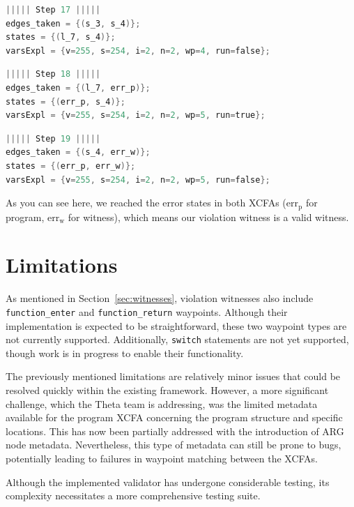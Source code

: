 \begin{lstlisting}[style=C, language=C, basicstyle=\ttfamily\footnotesize, columns=flexible,
    breaklines=true, breakatwhitespace=true, tabsize=2, showstringspaces=false]
||||| Step 17 |||||
edges_taken = {(s_3, s_4)};
states = {(l_7, s_4)};
varsExpl = {v=255, s=254, i=2, n=2, wp=4, run=false};
\end{lstlisting}
\begin{lstlisting}[style=C, language=C, basicstyle=\ttfamily\footnotesize, columns=flexible,
    breaklines=true, breakatwhitespace=true, tabsize=2, showstringspaces=false]
||||| Step 18 |||||
edges_taken = {(l_7, err_p)};
states = {(err_p, s_4)};
varsExpl = {v=255, s=254, i=2, n=2, wp=5, run=true};
\end{lstlisting}
\begin{lstlisting}[style=C, language=C, basicstyle=\ttfamily\footnotesize, columns=flexible,
    breaklines=true, breakatwhitespace=true, tabsize=2, showstringspaces=false]
||||| Step 19 |||||
edges_taken = {(s_4, err_w)};
states = {(err_p, err_w)};
varsExpl = {v=255, s=254, i=2, n=2, wp=5, run=false};
\end{lstlisting}
As you can see here, we reached the error states in both XCFAs ($\text{err}_\text{p}$ for program,
$\text{err}_\text{w}$ for witness), which means our violation witness is a valid witness.


\section{Limitations}

As mentioned in Section~\ref{sec:witnesses}, violation witnesses also include \texttt{function\_enter} and
\texttt{function\_return} waypoints. Although their implementation is expected to be
straightforward, these two waypoint types are not currently supported.
Additionally, \texttt{switch} statements are not yet supported, though work is in progress
to enable their functionality.

The previously mentioned limitations are relatively minor issues that could be resolved
quickly within the existing framework. However, a more significant challenge, which the
Theta team is addressing, was the limited metadata available for the program XCFA
concerning the program structure and specific locations. This has now been partially
addressed with the introduction of ARG node metadata. Nevertheless, this type of metadata
can still be prone to bugs, potentially leading to failures in waypoint matching between
the XCFAs.

Although the implemented validator has undergone considerable testing, its complexity
necessitates a more comprehensive testing suite.

